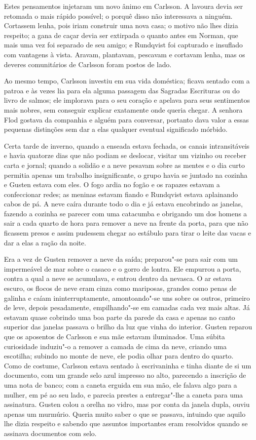 Estes pensamentos injetaram um novo ânimo em Carlsson. A lavoura devia ser
retomada o mais rápido possível; o porquê disso não interessava a ninguém. Cortassem
lenha, pois iriam construir uma nova casa; o motivo não lhes
dizia respeito; a gana de caçar devia ser extirpada o quanto antes em Norman, que
mais uma vez foi separado de seu amigo; e Rundqvist foi capturado e insuflado
com vantagens à vista. Aravam, plantavam, pescavam e cortavam lenha, mas os deveres
comunitários de Carlsson foram postos de lado. 

Ao mesmo tempo, Carlsson investiu em sua vida doméstica; ficava sentado 
com a patroa e às vezes lia para ela alguma
passagem das Sagradas Escrituras ou do livro de salmos; ele implorava para o seu
coração e apelava para seus sentimentos mais nobres, sem conseguir explicar
exatamente onde queria chegar. A senhora Flod gostava da companhia e alguém para
conversar, portanto dava valor a essas pequenas distinções sem dar a elas 
qualquer eventual significado mórbido.

Certa tarde de inverno, quando a enseada estava fechada, os canais intransitáveis
e havia quatorze dias que não podiam se deslocar, visitar um vizinho ou
receber carta e jornal; quando a solidão e a neve pesavam sobre as
mentes e o dia curto permitia apenas um trabalho insignificante, o grupo havia
se juntado na cozinha e Gusten estava com eles. O fogo ardia no fogão e os rapazes
estavam a confeccionar redes; as meninas estavam fiando e Rundqvist estava
aplainando cabos de pá. A neve caíra durante todo o dia e já estava encobrindo
as janelas, fazendo a cozinha se parecer com uma catacumba e obrigando um dos
homens a sair a cada quarto de hora para remover a neve na frente da porta, para
que não ficassem presos e assim pudessem chegar ao estábulo para tirar o
leite das vacas e dar a elas a ração da noite.

Era a vez de Gusten remover a neve da saída; preparou"-se para sair com um impermeável de mar sobre o
casaco e o gorro de lontra. Ele empurrou a porta, contra
a qual a neve se acumulava, e entrou dentro da nevasca. O ar estava escuro, os
flocos de neve eram cinza como mariposas, grandes como penas de galinha e
caíam ininterruptamente, amontoando"-se uns sobre os outros,
primeiro de leve, depois pesadamente, empilhando"-se em camadas cada vez mais altas. 
Já estavam quase cobrindo uma boa parte da parede da casa e apenas no canto superior das
janelas passava o brilho da luz que vinha do interior. Gusten reparou que os
aposentos de Carlsson e sua mãe estavam iluminados. Uma súbita curiosidade
induziu"-o a remover a camada de cima da neve, criando uma escotilha; subindo
no monte de neve, ele podia olhar para dentro do quarto. Como de costume,
Carlsson estava sentado à escrivaninha e tinha diante de si um documento, com um
grande selo azul impresso no alto, parecendo a inscrição de uma nota de banco;
com a caneta erguida em sua mão, ele falava algo para a mulher, em pé ao seu
lado, e parecia prestes a entregar"-lhe a caneta para uma assinatura. Gusten colou
a orelha no vidro, mas por conta da janela dupla, ouviu apenas um murmúrio.
Queria muito saber o que se passava, intuindo que aquilo lhe dizia respeito
e sabendo que assuntos importantes eram resolvidos quando se assinava documentos
com selo.


